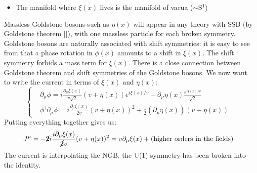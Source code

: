 \documentclass[../main.tex]{subfiles}
\begin{document}
\begin{example}
\begin{itemize}
    \item The manifold where $\xi(x)$ lives is the manifold of vacua ($\sim$S$^1$)
\end{itemize}
Massless Goldstone bosons such as $\eta(x)$ will appear in any theory with SSB (by Goldstone theorem []), with one massless particle for each broken symmetry. Goldstone bosons are naturally associated with shift symmetries: it is easy to see from  that a phase rotation in $\phi(x)$ amounts to a shift in $\xi(x)$. The shift symmetry forbids a mass term for $\xi(x)$. There is a close connection between Goldstone theorem and shift symmetries of the Goldstone bosons. We now want to write the current in terms of $\xi(x)$ and $\eta(x)$:
\[
\left\{
\begin{aligned}
&\partial_\mu\phi=i\frac{\partial_\mu\xi(x)}{v\sqrt{2}}(v+\eta(x))e^{i\xi(x)/v}+\partial_\mu\eta(x)\frac{e^{i\xi(x)/v}}{\sqrt{2}}\\
&\phi^\dagger\partial_\mu\phi=i\frac{\partial_\mu\xi(x)}{2v}(v+\eta(x))^2+\frac{1}{2}(\partial_\mu\eta(x))(v+\eta(x))
\end{aligned}
\right.
\]
Putting everything together gives us:
\[
J^\mu=-\cancel{2}i\frac{i\partial_\mu\xi(x)}{\cancel{2}v}(v+\eta(x))^2=v\partial_\mu\xi(x)+(\text{higher orders in the fields})
\]
The current is interpolating the NGB, the U(1) symmetry has been broken into the identity.
\end{example}
\end{document}
